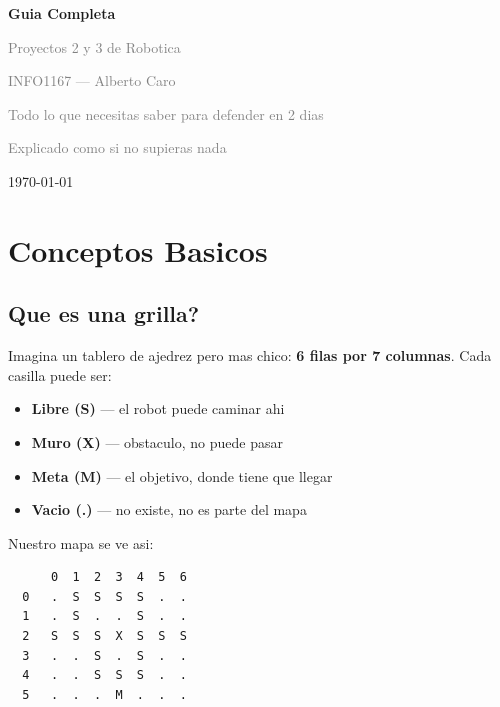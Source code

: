\documentclass[11pt,a4paper]{article}
\begin{document}
\begin{titlepage}
\centering
\vspace*{3cm}
{\Huge\bfseries\textcolor{darktext}{Guia Completa}\par}
\vspace{0.8cm}
{\LARGE\textcolor{graytext}{Proyectos 2 y 3 de Robotica}\par}
\vspace{0.5cm}
{\Large\textcolor{graytext}{INFO1167 — Alberto Caro}\par}
\vspace{2cm}
{\large\textcolor{graytext}{Todo lo que necesitas saber para defender en 2 dias}\par}
\vspace{0.3cm}
{\large\textcolor{graytext}{Explicado como si no supieras nada}\par}
\vfill
{\large\today\par}
\end{titlepage}

\tableofcontents
\newpage

\section{Conceptos Basicos}

\subsection{Que es una grilla?}

Imagina un tablero de ajedrez pero mas chico: \textbf{6 filas por 7 columnas}. Cada casilla puede ser:

\begin{itemize}
    \item \textbf{Libre (S)} — el robot puede caminar ahi
    \item \textbf{Muro (X)} — obstaculo, no puede pasar
    \item \textbf{Meta (M)} — el objetivo, donde tiene que llegar
    \item \textbf{Vacio (.)} — no existe, no es parte del mapa
\end{itemize}

Nuestro mapa se ve asi:

\begin{lstlisting}
      0  1  2  3  4  5  6
  0   .  S  S  S  S  .  .
  1   .  S  .  .  S  .  .
  2   S  S  S  X  S  S  S
  3   .  .  S  .  S  .  .
  4   .  .  S  S  S  .  .
  5   .  .  .  M  .  .  .
\end{lstlisting}
\end{document}
